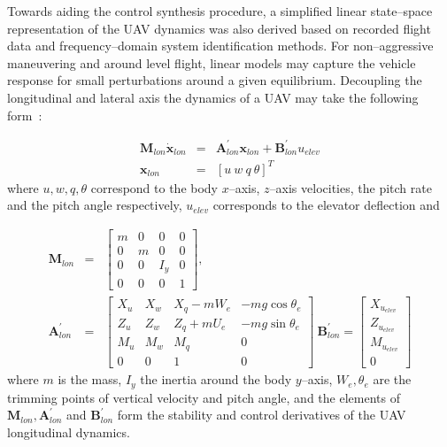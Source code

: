 
Towards aiding the control synthesis procedure, a simplified linear state--space representation of the UAV dynamics was also derived based on recorded flight data and frequency--domain system identification methods. For non--aggressive maneuvering and around level flight, linear models may capture the vehicle response for small perturbations around a given equilibrium. Decoupling the longitudinal and lateral axis the dynamics of a UAV may take the following form~\cite{dorobantu2011frequency,OMLAS_MED_14}: 

\small
\begin{eqnarray}\label{LON_DYN}
 \mathbf{M}_{lon}\dot{\mathbf{x}}_{lon} &=& \mathbf{A}^\prime_{lon}\mathbf{x}_{lon}+\mathbf{B}^\prime_{lon}u_{elev} \\ \nonumber
 \mathbf{x}_{lon} &=& \left[ u~w~q~\theta \right]^T
\end{eqnarray}
\normalsize
where $u,w,q,\theta$ correspond to the body $x$--axis, $z$--axis velocities, the pitch rate and the pitch angle respectively, $u_{elev}$ corresponds to the elevator deflection and

\footnotesize

\begin{eqnarray}
\mathbf{M}_{lon} &=& \begin{bmatrix}

m & 0 & 0 & 0\\ 
0 & m & 0 & 0\\ 
0 & 0 & I_y & 0\\ 
0 & 0 & 0 & 1
\end{bmatrix},\\ \nonumber
\mathbf{A}^\prime_{lon} &=& \begin{bmatrix}
X_u & X_w & X_q-mW_e & -mg\cos\theta_e\\ 
Z_u & Z_w & Z_q+mU_e & -mg\sin\theta_e\\ 
M_u & M_w & M_q & 0 \\ 
0 & 0 & 1 & 0
\end{bmatrix}~
\mathbf{B}^\prime_{lon} = \begin{bmatrix}
X_{u_{elev}}\\ 
Z_{u_{elev}}\\ 
M_{u_{elev}}\\ 
0
\end{bmatrix}
\end{eqnarray}
\normalsize
where $m$ is the mass, $I_y$ the inertia around the body $y$--axis, $W_e,\theta_e$ are the trimming points of vertical velocity and pitch angle, and the elements of $\mathbf{M}_{lon},\mathbf{A}^\prime_{lon}$ and $\mathbf{B}^\prime_{lon}$ form the stability and control derivatives of the UAV longitudinal dynamics. 

